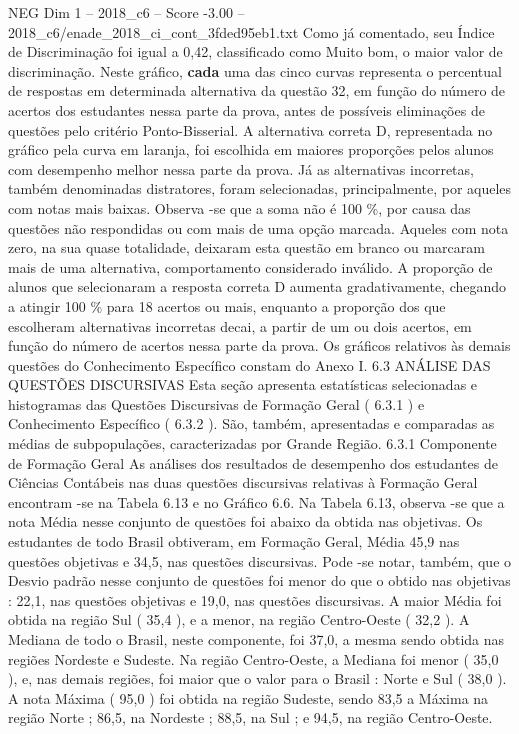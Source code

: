 \begin{textsample}{NEG Dim 1 – 2018\_c6 – Score -3.00 – 2018\_c6/enade\_2018\_ci\_cont\_3fded95eb1.txt}
Como já comentado, seu Índice de Discriminação foi igual a 0,42, classificado como Muito bom, o maior valor de discriminação.
Neste gráfico, \textbf{cada} uma das cinco curvas representa o percentual de respostas em determinada alternativa da questão 32, em função do número de acertos dos estudantes nessa parte da prova, antes de possíveis eliminações de questões pelo critério Ponto-Bisserial.
A alternativa correta D, representada no gráfico pela curva em laranja, foi escolhida em maiores proporções pelos alunos com desempenho melhor nessa parte da prova.
Já as alternativas incorretas, também denominadas distratores, foram selecionadas, principalmente, por aqueles com notas mais baixas.
Observa -se que a soma não é 100 \%, por causa das questões não respondidas ou com mais de uma opção marcada.
Aqueles com nota zero, na sua quase totalidade, deixaram esta questão em branco ou marcaram mais de uma alternativa, comportamento considerado inválido.
A proporção de alunos que selecionaram a resposta correta D aumenta gradativamente, chegando a atingir 100 \% para 18 acertos ou mais, enquanto a proporção dos que escolheram alternativas incorretas decai, a partir de um ou dois acertos, em função do número de acertos nessa parte da prova.
Os gráficos relativos às demais questões do Conhecimento Específico constam do Anexo I. 6.3 ANÁLISE DAS QUESTÕES DISCURSIVAS Esta seção apresenta estatísticas selecionadas e histogramas das Questões Discursivas de Formação Geral ( 6.3.1 ) e Conhecimento Específico ( 6.3.2 ).
São, também, apresentadas e comparadas as médias de subpopulações, caracterizadas por Grande Região. 6.3.1 Componente de Formação Geral As análises dos resultados de desempenho dos estudantes de Ciências Contábeis nas duas questões discursivas relativas à Formação Geral encontram -se na Tabela 6.13 e no Gráfico 6.6.
Na Tabela 6.13, observa -se que a nota Média nesse conjunto de questões foi abaixo da obtida nas objetivas.
Os estudantes de todo Brasil obtiveram, em Formação Geral, Média 45,9 nas questões objetivas e 34,5, nas questões discursivas.
Pode -se notar, também, que o Desvio padrão nesse conjunto de questões foi menor do que o obtido nas objetivas : 22,1, nas questões objetivas e 19,0, nas questões discursivas.
A maior Média foi obtida na região Sul ( 35,4 ), e a menor, na região Centro-Oeste ( 32,2 ).
A Mediana de todo o Brasil, neste componente, foi 37,0, a mesma sendo obtida nas regiões Nordeste e Sudeste.
Na região Centro-Oeste, a Mediana foi menor ( 35,0 ), e, nas demais regiões, foi maior que o valor para o Brasil : Norte e Sul ( 38,0 ).
A nota Máxima ( 95,0 ) foi obtida na região Sudeste, sendo 83,5 a Máxima na região Norte ; 86,5, na Nordeste ; 88,5, na Sul ; e 94,5, na região Centro-Oeste.

\end{textsample}
